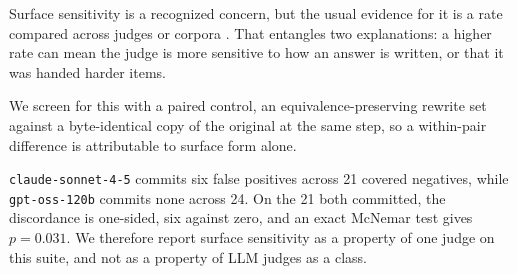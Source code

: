 Surface sensitivity is a recognized concern, but the usual evidence for it is a
rate compared across judges or corpora
\citep{wang2024faireval,zeng2024llmbar,thakur2025judging}. That entangles two
explanations: a higher rate can mean the judge is more sensitive to how an
answer is written, or that it was handed harder items.

We screen for this with a paired control, an equivalence-preserving rewrite
set against a byte-identical copy of the original at the same step, so a
within-pair difference is attributable to surface form alone.

\texttt{claude-sonnet-4-5} commits six false positives across 21 covered
negatives, while \texttt{gpt-oss-120b} commits none across 24. On the 21 both
committed, the discordance is one-sided, six against zero, and an exact
McNemar test gives $p = 0.031$. We
therefore report surface sensitivity as a property of one judge on this suite,
and not as a property of LLM judges as a class.
